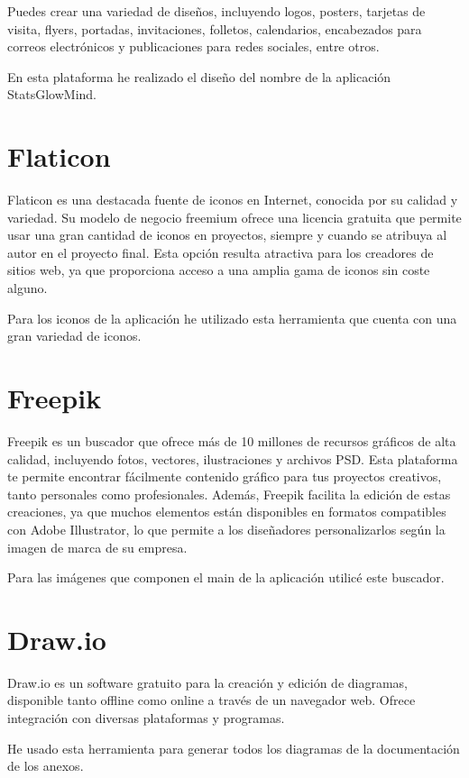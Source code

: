 Puedes crear una variedad de diseños, incluyendo logos, posters, tarjetas de visita, flyers, portadas, invitaciones, folletos, calendarios, encabezados para correos electrónicos y publicaciones para redes sociales, entre otros.

En esta plataforma he realizado el diseño del nombre de la aplicación StatsGlowMind.

\section{Flaticon}
Flaticon \cite{flaticon} es una destacada fuente de iconos en Internet, conocida por su calidad y variedad. Su modelo de negocio freemium ofrece una licencia gratuita que permite usar una gran cantidad de iconos en proyectos, siempre y cuando se atribuya al autor en el proyecto final. Esta opción resulta atractiva para los creadores de sitios web, ya que proporciona acceso a una amplia gama de iconos sin coste alguno.

Para los iconos de la aplicación he utilizado esta herramienta que cuenta con una gran variedad de iconos.

\section{Freepik}
Freepik \cite{freepik} es un buscador que ofrece más de 10 millones de recursos gráficos de alta calidad, incluyendo fotos, vectores, ilustraciones y archivos PSD. Esta plataforma te permite encontrar fácilmente contenido gráfico para tus proyectos creativos, tanto personales como profesionales. Además, Freepik facilita la edición de estas creaciones, ya que muchos elementos están disponibles en formatos compatibles con Adobe Illustrator, lo que permite a los diseñadores personalizarlos según la imagen de marca de su empresa.

Para las imágenes que componen el main de la aplicación utilicé este buscador.


\section{Draw.io}

Draw.io \cite{drawio} es un software gratuito para la creación y edición de diagramas, disponible tanto offline como online a través de un navegador web. Ofrece integración con diversas plataformas y programas.

He usado esta herramienta para generar todos los diagramas de la documentación de los anexos.


